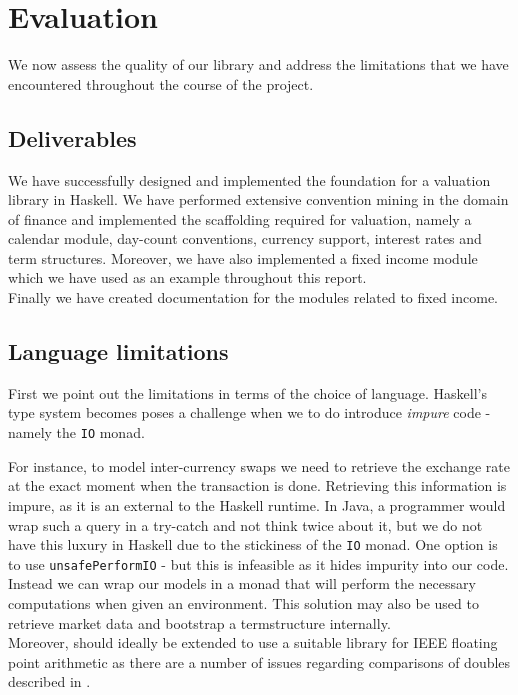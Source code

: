 \chapter{Evaluation}

We now assess the quality of our library and address the limitations that we
have encountered throughout the course of the project.

\section{Deliverables}

We have successfully designed and implemented the foundation for a valuation 
library in Haskell. We have performed extensive convention mining in the domain
of finance and implemented the scaffolding required for valuation, 
namely a calendar module, day-count conventions, currency support, interest 
rates and term structures. Moreover, we have also implemented a fixed income 
module which we have used as an example throughout this report.\\
Finally we have created documentation for the modules related to fixed 
income\cite{hqldoc}.

\section{Language limitations}

First we point out the limitations in terms of the choice of language.
Haskell's type system becomes poses a challenge when we to do introduce
\emph{impure} code - namely the \texttt{IO} monad.

For instance, to model inter-currency swaps we need to retrieve the exchange 
rate at the exact moment when the transaction is done. Retrieving this 
information is impure, as it is an external to the Haskell runtime. In Java, a 
programmer would wrap such a query in a try-catch and not think twice about it,
but we do not have this luxury in Haskell due to the stickiness of the 
\texttt{IO} monad. One option is to use \texttt{unsafePerformIO} - but this is 
infeasible as it hides impurity into our code.
Instead we can wrap our models in a monad that will perform the necessary 
computations when given an environment. This solution may also be used to 
retrieve market data and bootstrap a termstructure internally.\\

Moreover, \hql should ideally be extended to use a suitable library for
IEEE floating point arithmetic as there are a number of issues regarding
comparisons of doubles described in \cite{blogpost}.\\

